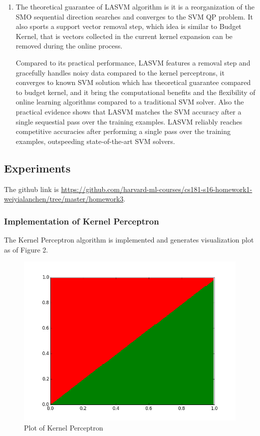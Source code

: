 \documentclass[submit]{harvardml}
\begin{document}
\begin{enumerate}
  \item The theoretical guarantee of LASVM algorithm is it is a reorganization of the SMO sequential direction searches and converges to the SVM QP problem. It also sports a support vector removal step, which idea is similar to Budget Kernel, that is vectors collected in the current kernel expansion can be removed during the online process.
  
  Compared to its practical performance, LASVM features a removal step and gracefully handles noisy data compared to the kernel perceptrons, it converges to known SVM solution which has theoretical guarantee compared to budget kernel, and it bring the computational benefits and the flexibility of online learning algorithms compared to a traditional SVM solver. Also the practical evidence shows that LASVM matches the SVM accuracy after a single sequestial pass over the training examples. LASVM reliably reaches competitive accuracies after performing a single pass over the training examples, outspeeding state-of-the-art SVM solvers.
  
\end{enumerate}

\subsection*{Experiments}
The github link is \url{https://github.com/harvard-ml-courses/cs181-s16-homework1-weiyialanchen/tree/master/homework3}.

\subsubsection*{Implementation of Kernel Perceptron}
The Kernel Perceptron algorithm is implemented and generates visualization plot as of Figure 2.
 
 \begin{figure}
     \centering
     \includegraphics[scale=0.3]{k.png}
     \caption{Plot of Kernel Perceptron}
 \end{figure}
\end{document}
